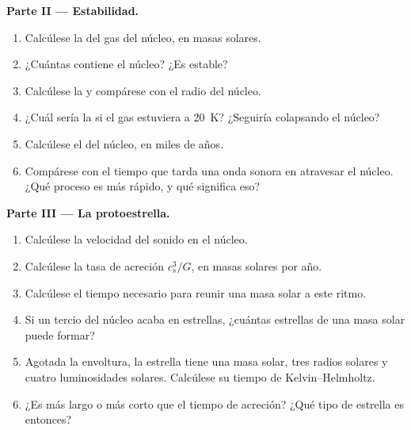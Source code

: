 \begin{problem}
\noindent\textbf{Parte II --- Estabilidad.}
\begin{enumerate}[resume]
  \item Calcúlese la  del gas del núcleo, en masas solares.
  \item ¿Cuántas  contiene el núcleo? ¿Es estable?
  \item Calcúlese la  y compárese con el radio del núcleo.
  \item ¿Cuál sería la  si el gas estuviera a \qty{20}{K}? ¿Seguiría
        colapsando el núcleo?
  \item Calcúlese el  del núcleo, en miles de años.
  \item Compárese con el tiempo que tarda una onda sonora en atravesar el núcleo. ¿Qué
        proceso es más rápido, y qué significa eso?
\end{enumerate}

\noindent\textbf{Parte III --- La protoestrella.}
\begin{enumerate}[resume]
  \item Calcúlese la velocidad del sonido en el núcleo.
  \item Calcúlese la tasa de acreción $c_s^3/G$, en masas solares por año.
  \item Calcúlese el tiempo necesario para reunir una masa solar a este ritmo.
  \item Si un tercio del núcleo acaba en estrellas, ¿cuántas estrellas de una masa solar
        puede formar?
  \item Agotada la envoltura, la estrella tiene una masa solar, tres radios
        solares y cuatro luminosidades solares. Calcúlese su tiempo de Kelvin--Helmholtz.
  \item ¿Es más largo o más corto que el tiempo de acreción? ¿Qué tipo de estrella es
        entonces?
\end{enumerate}


\end{problem}
